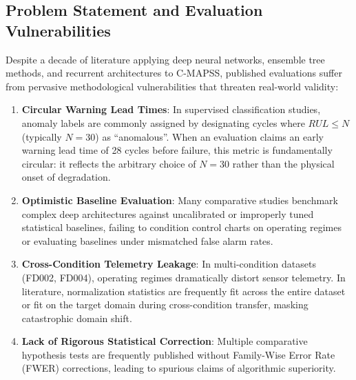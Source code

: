 \subsection{Problem Statement and Evaluation Vulnerabilities}
Despite a decade of literature applying deep neural networks, ensemble tree methods, and recurrent architectures to C-MAPSS, published evaluations suffer from pervasive methodological vulnerabilities that threaten real-world validity:
\begin{enumerate}
    \item \textbf{Circular Warning Lead Times}: In supervised classification studies, anomaly labels are commonly assigned by designating cycles where $RUL \le N$ (typically $N=30$) as ``anomalous''. When an evaluation claims an early warning lead time of 28 cycles before failure, this metric is fundamentally circular: it reflects the arbitrary choice of $N=30$ rather than the physical onset of degradation.
    \item \textbf{Optimistic Baseline Evaluation}: Many comparative studies benchmark complex deep architectures against uncalibrated or improperly tuned statistical baselines, failing to condition control charts on operating regimes or evaluating baselines under mismatched false alarm rates.
    \item \textbf{Cross-Condition Telemetry Leakage}: In multi-condition datasets (FD002, FD004), operating regimes dramatically distort sensor telemetry. In literature, normalization statistics are frequently fit across the entire dataset or fit on the target domain during cross-condition transfer, masking catastrophic domain shift.
    \item \textbf{Lack of Rigorous Statistical Correction}: Multiple comparative hypothesis tests are frequently published without Family-Wise Error Rate (FWER) corrections, leading to spurious claims of algorithmic superiority.
\end{enumerate}

